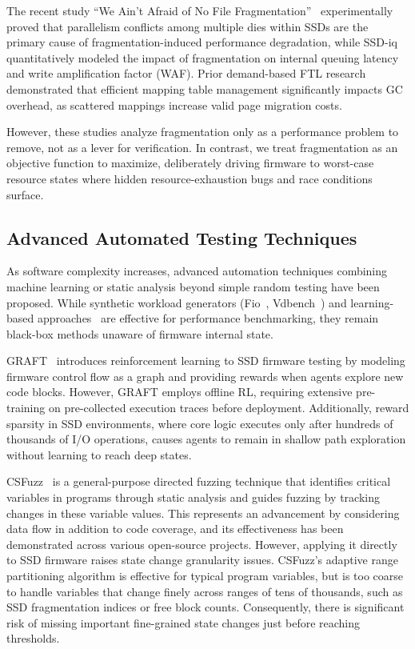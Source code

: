\documentclass[conference]{IEEEtran}
\begin{document}
The recent study ``We Ain't Afraid of No File Fragmentation''~\cite{jun2024we} experimentally proved that parallelism conflicts among multiple dies within SSDs are the primary cause of fragmentation-induced performance degradation, while SSD-iq~\cite{haas2025ssd} quantitatively modeled the impact of fragmentation on internal queuing latency and write amplification factor (WAF).
Prior demand-based FTL research~\cite{dftl} demonstrated that efficient mapping table management significantly impacts GC overhead, as scattered mappings increase valid page migration costs.

However, these studies analyze fragmentation only as a performance problem to remove, not as a lever for verification.
In contrast, we treat fragmentation as an objective function to maximize, deliberately driving firmware to worst-case resource states where hidden resource-exhaustion bugs and race conditions surface.

\subsection{Advanced Automated Testing Techniques}
As software complexity increases, advanced automation techniques combining machine learning or static analysis beyond simple random testing have been proposed.
While synthetic workload generators (Fio~\cite{fio}, Vdbench~\cite{berryman2010vdbench}) and learning-based approaches~\cite{lin2022gan} are effective for performance benchmarking, they remain black-box methods unaware of firmware internal state.

GRAFT~\cite{graft} introduces reinforcement learning to SSD firmware testing by modeling firmware control flow as a graph and providing rewards when agents explore new code blocks.
However, GRAFT employs offline RL, requiring extensive pre-training on pre-collected execution traces before deployment.
Additionally, reward sparsity in SSD environments, where core logic executes only after hundreds of thousands of I/O operations, causes agents to remain in shallow path exploration without learning to reach deep states.

CSFuzz~\cite{csfuzz} is a general-purpose directed fuzzing technique that identifies critical variables in programs through static analysis and guides fuzzing by tracking changes in these variable values.
This represents an advancement by considering data flow in addition to code coverage, and its effectiveness has been demonstrated across various open-source projects.
However, applying it directly to SSD firmware raises state change granularity issues.
CSFuzz's adaptive range partitioning algorithm is effective for typical program variables, but is too coarse to handle variables that change finely across ranges of tens of thousands, such as SSD fragmentation indices or free block counts.
Consequently, there is significant risk of missing important fine-grained state changes just before reaching thresholds.
\end{document}
